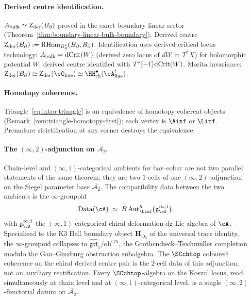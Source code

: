 \paragraph{Derived centre identification.}
$A_{\mathrm{bulk}} \simeq \operatorname{Z}_{\mathrm{der}}(B_{\partial})$ proved in the exact
boundary-linear sector
(Theorem~\ref{thm:boundary-linear-bulk-boundary}). Derived
centre $\operatorname{Z}_{\mathrm{der}}(B_{\partial}) := \operatorname{RHom}_{B_{\partial}^e}(B_{\partial}, B_{\partial})$.
Identification uses derived critical locus technology: $A_{\mathrm{bulk}} =
\operatorname{dCrit}(W)$ (derived zero locus of $dW$ in $T^*X$) for
holomorphic potential $W$; derived centre identified with
$T^*[-1]\operatorname{dCrit}(W)$. Morita invariance:
$\Zder(\Bbound) \simeq \Zder(\cC_{\mathrm{line}}) \simeq
\HH^\bullet_{\mathrm{ch}}(\cA^!_{\mathrm{line}})$.

\paragraph{Homotopy coherence.}
Triangle~\eqref{eq:intro-triangle} is an equivalence of
homotopy-coherent objects
(Remark~\ref{rem:triangle-homotopy-first}); each vertex is
$\Ainf$ or $\Linf$. Premature strictification at any corner
destroys the equivalence.

\paragraph{The $(\infty, 2)$-adjunction on
$\overline{\mathcal A_2}$.}
Chain-level and $(\infty, 1)$-categorical ambients for bar--cobar
are not two parallel statements of the same theorem; they are
two $1$-cells of one $(\infty, 2)$-adjunction on the Siegel
parameter base $\overline{\mathcal A_2}$. The compatibility
data between the two ambients is the $\infty$-groupoid
\[
 \mathrm{Data}(\cA)
 \;\simeq\;
 B\,\mathrm{Aut}^h_{\Linf}\bigl(\mathfrak g^{\infty,1}_\cA\bigr),
\]
with $\mathfrak g^{\infty,1}_\cA$ the
$(\infty,1)$-categorical chiral deformation dg Lie algebra of
$\cA$. Specialised to the K3 Hall boundary object
$\mathbf H_{\Delta_5}$ of the universal trace identity, the
$\infty$-groupoid collapses to
$\widehat{\mathfrak{grt}}_1 / \mathrm{ob}^{\mathrm{GN}}$, the
Grothendieck--Teichm\"uller completion modulo the Gan--Ginzburg
obstruction subalgebra. The $\SCchtop$ coloured coherence on the
chiral derived centre pair is the $2$-cell data of this
adjunction, not an auxiliary rectification. Every
$\SCchtop$-algebra on the Koszul locus, read simultaneously at
chain level and at $(\infty, 1)$-categorical level, is a single
$(\infty, 2)$-functorial datum on $\overline{\mathcal A_2}$.

